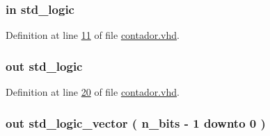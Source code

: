 \subsubsection[{clk}]{ {\bfseries \textcolor{keywordflow}{in}\textcolor{vhdlchar}{ }} {\bfseries \textcolor{comment}{std\+\_\+logic}\textcolor{vhdlchar}{ }} \hspace{0.3cm}{\ttfamily [Port]}}\label{classcontador_a4a4609c199d30b3adebbeb3a01276ec5}


Definition at line \hyperlink{contador_8vhd_source_l00011}{11} of file \hyperlink{contador_8vhd_source}{contador.\+vhd}.

\hypertarget{classcontador_a6fde1dafa392e429c8be2ce998a99f97}{}
\subsubsection[{comp}]{ {\bfseries \textcolor{keywordflow}{out}\textcolor{vhdlchar}{ }} {\bfseries \textcolor{comment}{std\+\_\+logic}\textcolor{vhdlchar}{ }} \hspace{0.3cm}{\ttfamily [Port]}}\label{classcontador_a6fde1dafa392e429c8be2ce998a99f97}


Definition at line \hyperlink{contador_8vhd_source_l00020}{20} of file \hyperlink{contador_8vhd_source}{contador.\+vhd}.

\hypertarget{classcontador_a4566909c8f114af9a0e58632500cd4e9}{}
\subsubsection[{count}]{ {\bfseries \textcolor{keywordflow}{out}\textcolor{vhdlchar}{ }} {\bfseries \textcolor{comment}{std\+\_\+logic\+\_\+vector}\textcolor{vhdlchar}{ }\textcolor{vhdlchar}{(}\textcolor{vhdlchar}{ }\textcolor{vhdlchar}{ }\textcolor{vhdlchar}{ }\textcolor{vhdlchar}{ }{\bfseries {\bf n\+\_\+bits}} \textcolor{vhdlchar}{-\/}\textcolor{vhdlchar}{ } \textcolor{vhdldigit}{1} \textcolor{vhdlchar}{ }\textcolor{keywordflow}{downto}\textcolor{vhdlchar}{ }\textcolor{vhdlchar}{ } \textcolor{vhdldigit}{0} \textcolor{vhdlchar}{ }\textcolor{vhdlchar}{)}\textcolor{vhdlchar}{ }} \hspace{0.3cm}{\ttfamily [Port]}}\label{classcontador_a4566909c8f114af9a0e58632500cd4e9}


